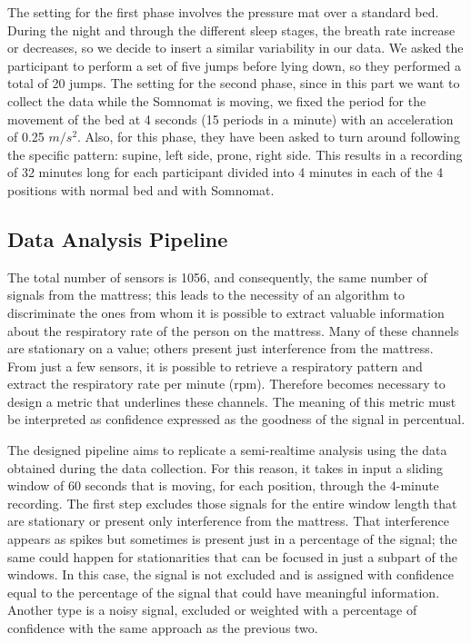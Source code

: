 \documentclass[a4paper,11pt, oneside,italian]{article}
\begin{document}
The setting for the first phase involves the pressure mat over a standard bed. During the night and through the different sleep stages, the breath rate increase or decreases, so we decide to insert a similar variability in our data. We asked the participant to perform a set of five jumps before lying down, so they performed a total of 20 jumps.
The setting for the second phase, since in this part we want to collect the data while the Somnomat is moving, we fixed the period for the movement of the bed at 4 seconds (15 periods in a minute) with an acceleration of 0.25 $m/s^2$. Also, for this phase, they have been asked to turn around following the specific pattern: supine, left side, prone, right side.
This results in a recording of 32 minutes long for each participant divided into 4 minutes in each of the 4 positions with normal bed and with Somnomat.


\subsection*{Data Analysis Pipeline}
The total number of sensors is 1056, and consequently, the same number of signals from the mattress; this leads to the necessity of an algorithm to discriminate the ones from whom 
it is possible to extract valuable information about the respiratory rate of the person on the mattress.
Many of these channels are stationary on a value; others present just interference from the 
mattress. From just a few sensors, it is possible to retrieve a respiratory pattern and extract the 
respiratory rate per minute (rpm). Therefore becomes necessary to design a metric that underlines these channels.
The meaning of this metric must be interpreted as confidence expressed as the goodness of the signal in percentual.

The designed pipeline aims to replicate a semi-realtime analysis using the data obtained during the data collection. 
For this reason, it takes in input a sliding window of 60 seconds that is moving, for each position, through the 4-minute recording.
The first step excludes those signals for the entire window length that are stationary or present only interference from the mattress.
That interference appears as spikes but sometimes is present just in a percentage of the signal; the same could happen for stationarities that can be focused in just a subpart of the windows. In this case, the signal is not excluded and is assigned with confidence equal to the percentage of the signal that could have meaningful information.
 Another type is a noisy signal, excluded or weighted with a percentage of confidence with the same approach as the previous two.
\end{document}

